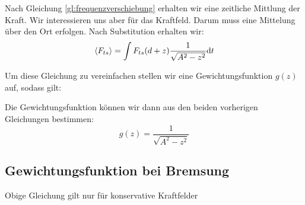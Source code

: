 Nach Gleichung \ref{gl:frequenzverschiebung} erhalten wir eine zeitliche Mittlung der Kraft. Wir interessieren uns aber für das Kraftfeld. Darum muss eine Mittelung über den Ort erfolgen.
Nach Substitution erhalten wir:
\begin{equation}
	\langle F_{ts} \rangle = \int F_{ts}(d + z) \frac{1}{\sqrt{A^2 - z^2}} \mathrm{d}t
\end{equation}

Um diese Gleichung zu vereinfachen stellen wir eine Gewichtungsfunktion $g(z)$ auf, sodass gilt:
\begin{equation}
\end{equation}

Die Gewichtungsfunktion können wir dann aus den beiden vorherigen Gleichungen bestimmen:
\begin{equation}
	g(z) = \frac{1}{\sqrt{A^2 - z^2}}
\end{equation}


\subsection{Gewichtungsfunktion bei Bremsung}
Obige Gleichung gilt nur für konservative Kraftfelder
